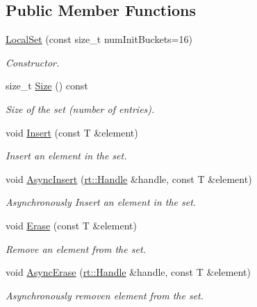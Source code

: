 \subsection*{Public Member Functions}
\begin{DoxyCompactItemize}
\item 
\hyperlink{classshad_1_1LocalSet_a99850024d94cb0737b0e40b5ca9852df}{Local\-Set} (const size\-\_\-t num\-Init\-Buckets=16)
\begin{DoxyCompactList}\small\item\em Constructor. \end{DoxyCompactList}\item 
size\-\_\-t \hyperlink{classshad_1_1LocalSet_a2a83315ad49f8b4b480ebc4ac2f3b332}{Size} () const 
\begin{DoxyCompactList}\small\item\em Size of the set (number of entries). \end{DoxyCompactList}\item 
void \hyperlink{classshad_1_1LocalSet_accfd1f83d7c95609a838f0913c99e8b5}{Insert} (const T \&element)
\begin{DoxyCompactList}\small\item\em Insert an element in the set. \end{DoxyCompactList}\item 
void \hyperlink{classshad_1_1LocalSet_a44073e097981a573ab59c6eb94c9fce6}{Async\-Insert} (\hyperlink{classshad_1_1rt_1_1Handle}{rt\-::\-Handle} \&handle, const T \&element)
\begin{DoxyCompactList}\small\item\em Asynchronously Insert an element in the set. \end{DoxyCompactList}\item 
void \hyperlink{classshad_1_1LocalSet_a4c97e21c48ee656819f08162c05b0479}{Erase} (const T \&element)
\begin{DoxyCompactList}\small\item\em Remove an element from the set. \end{DoxyCompactList}\item 
void \hyperlink{classshad_1_1LocalSet_ab8f41a8bca2ae9c2febb97ab01e63579}{Async\-Erase} (\hyperlink{classshad_1_1rt_1_1Handle}{rt\-::\-Handle} \&handle, const T \&element)
\begin{DoxyCompactList}\small\item\em Asynchronously removen element from the set. \end{DoxyCompactList}\item 

\end{DoxyCompactItemize}
